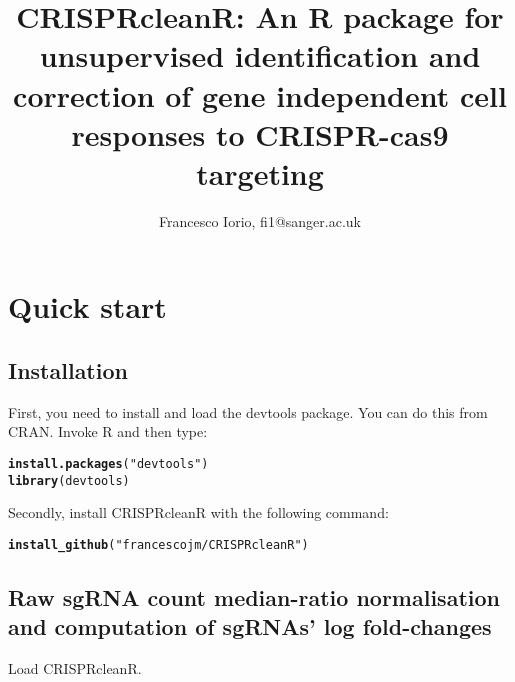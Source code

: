 \documentclass{article}\usepackage[]{graphicx}\usepackage[]{color}
\makeatletter
\newcommand{\hlstr}[1]{\textcolor[rgb]{0.192,0.494,0.8}{#1}}%
\newcommand{\hlstd}[1]{\textcolor[rgb]{0.345,0.345,0.345}{#1}}%
\newcommand{\hlkwd}[1]{\textcolor[rgb]{0.737,0.353,0.396}{\textbf{#1}}}%
\newenvironment{kframe}{%
 \def\at@end@of@kframe{}%
 \ifinner\ifhmode%
  \def\at@end@of@kframe{\end{minipage}}%
  \begin{minipage}{\columnwidth}%
 \fi\fi%
 \def\FrameCommand##1{\hskip\@totalleftmargin \hskip-\fboxsep
 \colorbox{shadecolor}{##1}\hskip-\fboxsep
     \hskip-\linewidth \hskip-\@totalleftmargin \hskip\columnwidth}%
 \MakeFramed {\advance\hsize-\width
   \@totalleftmargin\z@ \linewidth\hsize
   \@setminipage}}%
 {\par\unskip\endMakeFramed%
 \at@end@of@kframe}
\newenvironment{knitrout}{}{} %
\makeatother
\begin{document}
\title{CRISPRcleanR: An R package for unsupervised identification and correction of gene independent cell responses to CRISPR-cas9 targeting}
\author{Francesco Iorio, fi1@sanger.ac.uk}
\maketitle
\section{Quick start}

\subsection{Installation}

First, you need to install and load the devtools package. You can do this from CRAN. Invoke R and then type:

\begin{knitrout}
\color{fgcolor}\begin{kframe}
\begin{alltt}
\hlkwd{install.packages}\hlstd{(}\hlstr{"devtools"}\hlstd{)}
\hlkwd{library}\hlstd{(devtools)}
\end{alltt}
\end{kframe}
\end{knitrout}

Secondly, install CRISPRcleanR with the following command:

\begin{knitrout}
\color{fgcolor}\begin{kframe}
\begin{alltt}
\hlkwd{install_github}\hlstd{(}\hlstr{"francescojm/CRISPRcleanR"}\hlstd{)}
\end{alltt}
\end{kframe}
\end{knitrout}

\subsection{Raw sgRNA count median-ratio normalisation and computation of sgRNAs' log fold-changes}

Load CRISPRcleanR.
\end{document}
